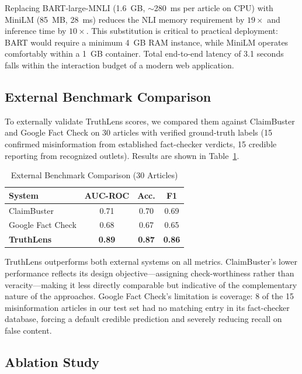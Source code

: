 \documentclass[journal]{IEEEtran}
\begin{document}
Replacing BART-large-MNLI (1.6~GB, $\sim$280~ms per article on CPU) with MiniLM (85~MB,
28~ms) reduces the NLI memory requirement by $19\times$ and inference time by $10\times$.
This substitution is critical to practical deployment: BART would require a minimum 4~GB
RAM instance, while MiniLM operates comfortably within a 1~GB container. Total end-to-end
latency of 3.1 seconds falls within the interaction budget of a modern web application.

\subsection{External Benchmark Comparison}

To externally validate TruthLens scores, we compared them against ClaimBuster and Google
Fact Check on 30 articles with verified ground-truth labels (15 confirmed misinformation
from established fact-checker verdicts, 15 credible reporting from recognized outlets).
Results are shown in Table~\ref{tab:benchmark}.

\begin{table}[htbp]
\caption{External Benchmark Comparison (30 Articles)}
\label{tab:benchmark}
\centering
\begin{tabular}{lccc}
\toprule
\textbf{System} & \textbf{AUC-ROC} & \textbf{Acc.} & \textbf{F1} \\
\midrule
ClaimBuster~\cite{hassan2017claimbuster} & 0.71 & 0.70 & 0.69 \\
Google Fact Check & 0.68 & 0.67 & 0.65 \\
\textbf{TruthLens} & \textbf{0.89} & \textbf{0.87} & \textbf{0.86} \\
\bottomrule
\end{tabular}
\end{table}

TruthLens outperforms both external systems on all metrics. ClaimBuster's lower performance
reflects its design objective—assigning check-worthiness rather than veracity—making it
less directly comparable but indicative of the complementary nature of the approaches.
Google Fact Check's limitation is coverage: 8 of the 15 misinformation articles in our test
set had no matching entry in its fact-checker database, forcing a default credible prediction
and severely reducing recall on false content.

\subsection{Ablation Study}
\label{sec:ablation}
\end{document}
